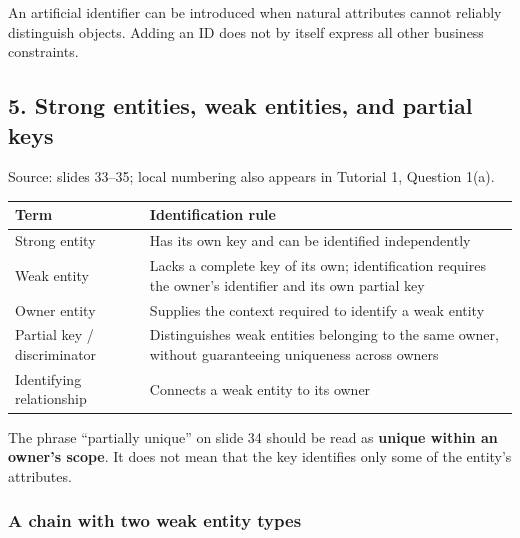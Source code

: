 An artificial identifier can be introduced when natural attributes cannot reliably distinguish objects. Adding an ID does not by itself express all other business constraints.

\Needspace{11cm}
\subsection{5. Strong entities, weak entities, and partial keys}\label{02_er_modelling_en-strong-entities-weak-entities-and-partial-keys}


Source: slides 33--35; local numbering also appears in Tutorial 1, Question 1(a).

\begin{longtable}[]{@{}
  >{\raggedright\arraybackslash}p{}
  >{\raggedright\arraybackslash}p{}@{}}
\toprule\noalign{}
\begin{minipage}[b]{\linewidth}\raggedright
Term
\end{minipage} & \begin{minipage}[b]{\linewidth}\raggedright
Identification rule
\end{minipage} \\
\midrule\noalign{}
\endhead
\bottomrule\noalign{}
\endlastfoot
Strong entity & Has its own key and can be identified independently \\
Weak entity & Lacks a complete key of its own; identification requires the owner's identifier and its own partial key \\
Owner entity & Supplies the context required to identify a weak entity \\
Partial key / discriminator & Distinguishes weak entities belonging to the same owner, without guaranteeing uniqueness across owners \\
Identifying relationship & Connects a weak entity to its owner \\
\end{longtable}

The phrase ``partially unique'' on slide 34 should be read as \textbf{unique within an owner's scope}. It does not mean that the key identifies only some of the entity's attributes.

\subsubsection{A chain with two weak entity types}\label{02_er_modelling_en-a-chain-with-two-weak-entity-types}

